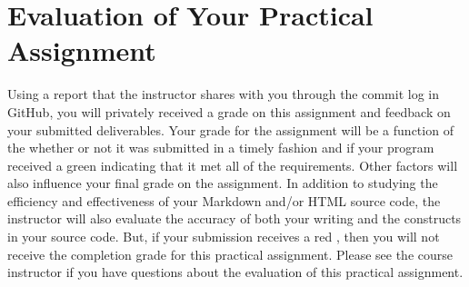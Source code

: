 \documentclass[11pt]{article}
\newcommand{\checkmark}{\ding{51}}
\newcommand{\naughtmark}{\ding{55}}
\begin{document}
\section*{Evaluation of Your Practical Assignment}

Using a report that the instructor shares with you through the commit log in
GitHub, you will privately received a grade on this assignment and feedback on
your submitted deliverables. Your grade for the assignment will be a function of
the whether or not it was submitted in a timely fashion and if your program
received a green \checkmark{} indicating that it met all of the requirements.
Other factors will also influence your final grade on the assignment. In
addition to studying the efficiency and effectiveness of your Markdown and/or
HTML source code, the instructor will also evaluate the accuracy of both your
writing and the constructs in your source code. But, if your submission receives
a red \naughtmark{}, then you will not receive the completion grade for this
practical assignment. Please see the course instructor if you have questions
about the evaluation of this practical assignment.


\end{document}

